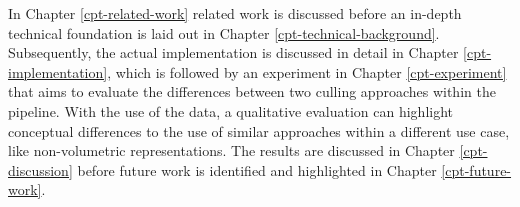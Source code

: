 \noindent
In Chapter \ref{cpt-related-work} related work is discussed before an in-depth technical foundation 
is laid out in Chapter \ref{cpt-technical-background}. Subsequently, the actual implementation is discussed 
in detail in Chapter \ref{cpt-implementation}, which is followed by an experiment in Chapter \ref{cpt-experiment} 
that aims to evaluate the differences between two culling approaches within the pipeline. With the use of the data, 
a qualitative evaluation can highlight conceptual differences to the use of similar approaches within a different 
use case, like non-volumetric representations. The results are discussed in Chapter \ref{cpt-discussion} before 
future work is identified and highlighted in Chapter \ref{cpt-future-work}. 
